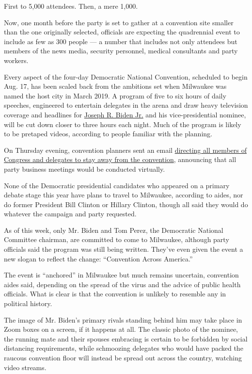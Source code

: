 First to 5,000 attendees. Then, a mere 1,000.

Now, one month before the party is set to gather at a convention site
smaller than the one originally selected, officials are expecting the
quadrennial event to include as few as 300 people --- a number that
includes not only attendees but members of the news media, security
personnel, medical consultants and party workers.

Every aspect of the four-day Democratic National Convention, scheduled
to begin Aug. 17, has been scaled back from the ambitions set when
Milwaukee was named the host city in March 2019. A program of five to
six hours of daily speeches, engineered to entertain delegates in the
arena and draw heavy television coverage and headlines for
\href{https://www.nytimes.com/interactive/2020/us/elections/joe-biden.html}{Joseph
R. Biden Jr.} and his vice-presidential nominee, will be cut down closer
to three hours each night. Much of the program is likely to be pretaped
videos, according to people familiar with the planning.

On Thursday evening, convention planners sent an email
\href{https://www.nytimes.com/2020/07/16/us/politics/democratic-convention-milwaukee.html?action=click\&module=Top\%20Stories\&pgtype=Homepage}{directing
all members of Congress and delegates to stay away from the convention},
announcing that all party business meetings would be conducted
virtually.

None of the Democratic presidential candidates who appeared on a primary
debate stage this year have plans to travel to Milwaukee, according to
aides, nor do former President Bill Clinton or Hillary Clinton, though
all said they would do whatever the campaign and party requested.

As of this week, only Mr. Biden and Tom Perez, the Democratic National
Committee chairman, are committed to come to Milwaukee, although party
officials said the program was still being written. They've even given
the event a new slogan to reflect the change: ``Convention Across
America.''

The event is ``anchored'' in Milwaukee but much remains uncertain,
convention aides said, depending on the spread of the virus and the
advice of public health officials. What is clear is that the convention
is unlikely to resemble any in political history.

The image of Mr. Biden's primary rivals standing behind him may take
place in Zoom boxes on a screen, if it happens at all. The classic photo
of the nominee, the running mate and their spouses embracing is certain
to be forbidden by social distancing requirements, while schmoozing
delegates who would have packed the raucous convention floor will
instead be spread out across the country, watching video streams.

